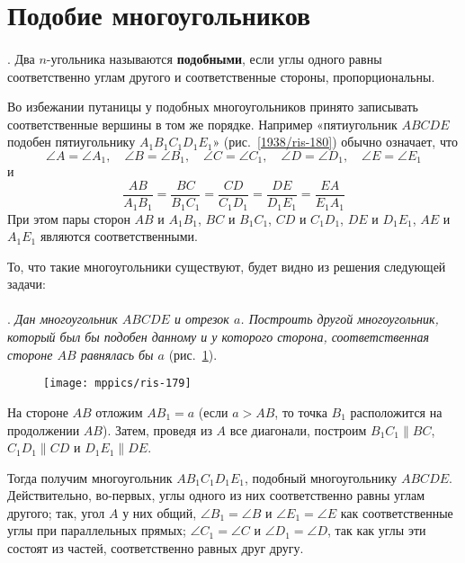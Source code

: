 \section{Подобие многоугольников}

\paragraph{}\label{1938/168}
.
Два $n$-угольника называются \textbf{подобными}, если углы одного равны соответственно углам другого и соответственные стороны, пропорциональны.

Во избежании путаницы у подобных многоугольников принято записывать соответственные вершины в том же порядке.
Например «пятиугольник
$ABCDE$ подобен пятиугольнику $A_1B_1C_1D_1E_1$» (рис.~\ref{1938/ris-180}) обычно означает, что  
\[\angle A = \angle A_1, 
\quad
\angle B=\angle B_1,
\quad
\angle C=\angle C_1,
\quad
\angle D=\angle D_1,
\quad
\angle E=\angle E_1\]
и
\[\frac{AB}{A_1B_1}=\frac{BC}{B_1C_1}=\frac{CD}{C_1D_1}=\frac{DE}{D_1E_1}=\frac{EA}{E_1A_1}\]
При этом пары сторон $AB$ и $A_1B_1$, $BC$ и $B_1C_1$, $CD$ и $C_1D_1$, $DE$ и $D_1E_1$, $AE$ и $A_1E_1$
являются соответственными.

То, что такие многоугольники существуют, будет видно из решения следующей задачи:

\paragraph{}\label{1938/169}
.
\emph{Дан многоугольник $ABCDE$ и отрезок $a$.
Построить другой многоугольник, который был бы подобен данному и у которого сторона, соответственная стороне $AB$ 
равнялась бы $a$} (рис.~\ref{1938/ris-179}).

\begin{figure}[h]
\centering
\texttt{[image: mppics/ris-179]}
\caption{}\label{1938/ris-179}
\end{figure}

На стороне $AB$ отложим $AB_1=a$ (если $a>AB$, то точка $B_1$ расположится на продолжении $AB$).
Затем, проведя из $A$ все диагонали, построим $B_1C_1 \parallel BC$, $C_1D_1\parallel CD$ и $D_1E_1\parallel DE$.

Тогда получим многоугольник $AB_1C_1D_1E_1$, подобный многоугольнику $ABCDE$.
Действительно, во-первых, углы одного из них соответственно равны углам другого;
так, угол $A$ у них общий, $\angle B_1=\angle B$ и $\angle E_1=\angle E$ как соответственные углы при параллельных прямых;
$\angle C_1=\angle C$ и $\angle D_1=\angle D$, так как углы эти состоят из частей, соответственно равных друг другу.


